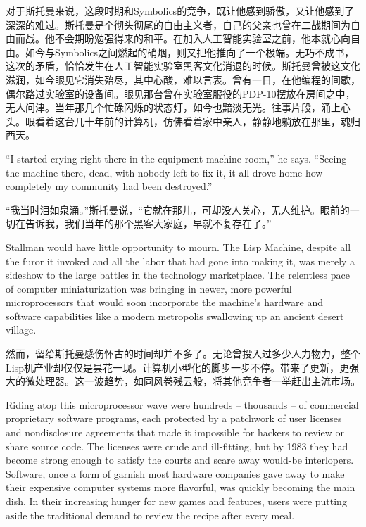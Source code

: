 \ifdefined\chs
对于斯托曼来说，这段时期和Symbolics的竞争，既让他感到骄傲，又让他感到了深深的难过。斯托曼是个彻头彻尾的自由主义者，自己的父亲也曾在二战期间为自由而战。他不会期盼勉强得来的和平。在加入人工智能实验室之前，他本就心向自由。如今与Symbolics之间燃起的硝烟，则又把他推向了一个极端。无巧不成书，这次的矛盾，恰恰发生在人工智能实验室黑客文化消退的时候。斯托曼曾被这文化滋润，如今眼见它消失殆尽，其中心酸，难以言表。曾有一日，在他编程的间歇，偶尔路过实验室的设备间。眼见那台曾在实验室服役的PDP-10摆放在房间之中，无人问津。当年那几个忙碌闪烁的状态灯，如今也黯淡无光。往事片段，涌上心头。眼看着这台几十年前的计算机，仿佛看着家中亲人，静静地躺放在那里，魂归西天。
\fi

\ifdefined\eng
``I started crying right there in the \ifdefined\vone equipment \fi\ifdefined\vtwo machine \fi room,'' he says. ``Seeing the machine there, dead, with nobody left to fix it, it all drove home how completely my community had been destroyed.''
\fi

\ifdefined\chs
``我当时泪如泉涌。''斯托曼说，``它就在那儿，可却没人关心，无人维护。眼前的一切在告诉我，我们当年的那个黑客大家庭，早就不复存在了。''
\fi

\ifdefined\eng
Stallman would have little opportunity to mourn. The Lisp Machine, despite all the furor it invoked and all the labor that had gone into making it, was merely a sideshow to the large battles in the technology marketplace. The relentless pace of computer miniaturization was bringing in newer, more powerful microprocessors that would soon incorporate the machine's hardware and software capabilities like a modern metropolis swallowing up an ancient desert village.
\fi

\ifdefined\chs
然而，留给斯托曼感伤怀古的时间却并不多了。无论曾投入过多少人力物力，整个Lisp机产业却仅仅是昙花一现。计算机小型化的脚步一步不停。带来了更新，更强大的微处理器。这一波趋势，如同风卷残云般，将其他竞争者一举赶出主流市场。
\fi

\ifdefined\eng
Riding atop this microprocessor wave were hundreds -- thousands -- of \ifdefined\vone commercial \fi\ifdefined\vtwo proprietary \fi software programs, each protected by a patchwork of user licenses and nondisclosure agreements that made it impossible for hackers to review or share source code. The licenses were crude and ill-fitting, but by 1983 they had become strong enough to satisfy the courts and scare away would-be interlopers. Software, once a form of garnish most hardware companies gave away to make their expensive computer systems more flavorful, was quickly becoming the main dish. In their increasing hunger for new games and features, users were putting aside the traditional demand to review the recipe after every meal.
\fi


